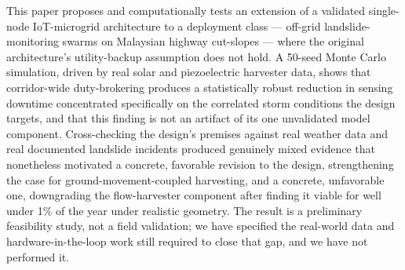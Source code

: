 \documentclass[electronics,article,submit,moreauthors]{Definitions/mdpi}
\begin{document}
This paper proposes and computationally tests an extension of a validated single-node IoT-microgrid architecture to a deployment class --- off-grid landslide-monitoring swarms on Malaysian highway cut-slopes --- where the original architecture's utility-backup assumption does not hold. A 50-seed Monte Carlo simulation, driven by real solar and piezoelectric harvester data, shows that corridor-wide duty-brokering produces a statistically robust reduction in sensing downtime concentrated specifically on the correlated storm conditions the design targets, and that this finding is not an artifact of its one unvalidated model component. Cross-checking the design's premises against real weather data and real documented landslide incidents produced genuinely mixed evidence that nonetheless motivated a concrete, favorable revision to the design, strengthening the case for ground-movement-coupled harvesting, and a concrete, unfavorable one, downgrading the flow-harvester component after finding it viable for well under 1\% of the year under realistic geometry. The result is a preliminary feasibility study, not a field validation; we have specified the real-world data and hardware-in-the-loop work still required to close that gap, and we have not performed it.

\vspace{6pt}





\end{document}
